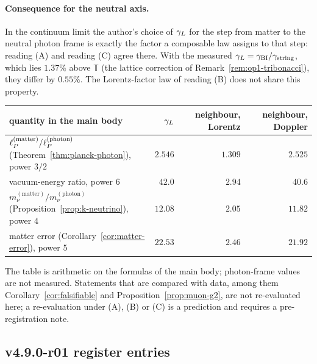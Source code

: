 \paragraph{Consequence for the neutral axis.}
In the continuum limit the author's choice of \(\gamma_L\) for the step from matter to the neutral photon frame is exactly the
factor a composable law assigns to that step: reading (A) and reading (C) agree there.  With the measured
\(\gamma_L=\gamma_{\mathrm{BI}}/\gamma_{\mathrm{string}}\), which lies \(1.37\%\) above \(\mathbb T\) (the lattice correction of
Remark~\ref{rem:op1-tribonacci}), they differ by \(0.55\%\).  The Lorentz-factor law of reading (B) does not share this
property.

\begin{center}
\small
\begin{tabular}{@{}lrrr@{}}
\toprule
quantity in the main body & \(\gamma_L\) & neighbour, Lorentz & neighbour, Doppler\\
\midrule
\(\ell_P^{(\mathrm{matter})}/\ell_P^{(\mathrm{photon})}\) (Theorem~\ref{thm:planck-photon}), power \(3/2\) & \(2.546\) & \(1.309\) & \(2.525\)\\
vacuum-energy ratio, power \(6\) & \(42.0\) & \(2.94\) & \(40.6\)\\
\(m_\nu^{(\mathrm{matter})}/m_\nu^{(\mathrm{photon})}\) (Proposition~\ref{prop:k-neutrino}), power \(4\) & \(12.08\) & \(2.05\) & \(11.82\)\\
matter error (Corollary~\ref{cor:matter-error}), power \(5\) & \(22.53\) & \(2.46\) & \(21.92\)\\
\bottomrule
\end{tabular}
\end{center}
The table is arithmetic on the formulas of the main body; photon-frame values are not measured.  Statements that are
compared with data, among them Corollary~\ref{cor:falsifiable} and Proposition~\ref{prop:muon-g2}, are not re-evaluated
here; a re-evaluation under (A), (B) or (C) is a prediction and requires a pre-registration note.

\subsection*{v4.9.0-r01 register entries}
\label{subsec:v490-r01-register}

